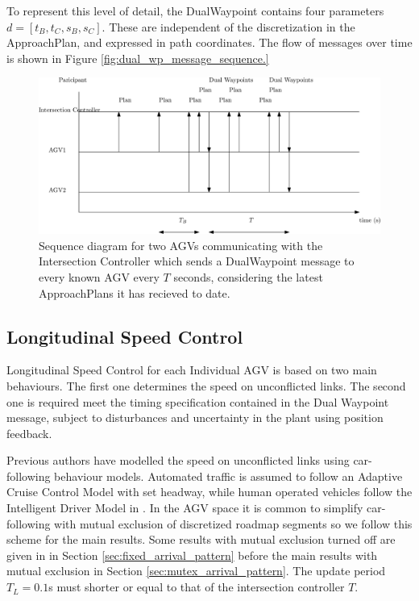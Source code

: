 To represent this level of detail, the DualWaypoint contains four parameters $d =[t_B, t_C, s_B, s_C]$. These are independent of the discretization in the ApproachPlan, and expressed in path coordinates. The flow of messages over time is shown in Figure \ref{fig:dual_wp_message_sequence.}

\begin{figure}[ht]
	\centering
	\includegraphics[width=0.9\linewidth]{dual_wp_message_sequence.eps}
	\caption{Sequence diagram for two AGVs communicating with the Intersection Controller which sends a DualWaypoint message to every known AGV every $T$ seconds, considering the latest ApproachPlans it has recieved to date. }
	\label{fig:dual_wp_message_sequence}
\end{figure}


\subsection{Longitudinal Speed Control}
Longitudinal Speed Control for each Individual AGV is based on two main behaviours. The first one determines the speed on unconflicted links. The second one is required meet the timing specification contained in the Dual Waypoint message, subject to disturbances and uncertainty in the plant using position feedback.  

Previous authors have modelled the speed on unconflicted links using car-following behaviour models. Automated traffic is assumed to follow an Adaptive Cruise Control Model with set headway, while human operated vehicles follow the Intelligent Driver Model in \cite{Baz2020}. In the AGV space it is common to simplify car-following with mutual exclusion of discretized roadmap segments  \cite{Digani2014coord} so we follow this scheme for the main results. Some results with mutual exclusion turned off are given in  in Section \ref{sec:fixed_arrival_pattern} before the main results with mutual exclusion in Section \ref{sec:mutex_arrival_pattern}. The update period $T_L=0.1$s must shorter or equal to that of the intersection controller $T$. 

